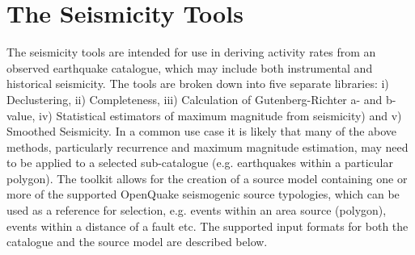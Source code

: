 %
%
%

\section{The Seismicity Tools}

The seismicity tools are intended for use in deriving activity rates from an observed earthquake catalogue, which may include both instrumental and historical seismicity. The tools are broken down into five separate libraries: i) Declustering, ii) Completeness, iii) Calculation of Gutenberg-Richter a- and b-value, iv) Statistical estimators of maximum magnitude from seismicity) and v) Smoothed Seismicity. In a common use case it is likely that many of the above methods, particularly recurrence and maximum magnitude estimation, may need to be applied to a selected sub-catalogue (e.g. earthquakes within a particular polygon). The toolkit allows for the creation of a source model containing one or more of the supported OpenQuake seismogenic source typologies, which can be used as a reference for selection, e.g. events within an area source (polygon), events within a distance of a fault etc. The supported input formats for both the catalogue and the source model are described below. 

